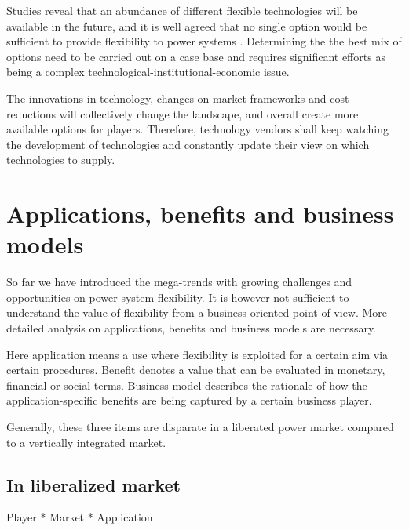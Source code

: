 Studies reveal that an abundance of different flexible technologies will be available in the future, and it is well agreed that no single option would be sufficient to provide flexibility to power systems \cite{Cochran2014,Wang2017,Lund2015,Muller2016}. Determining the the best mix of options need to be carried out on a case base and requires significant efforts as being a complex technological-institutional-economic issue. 

The innovations in technology, changes on market frameworks and cost reductions will collectively change the landscape, and overall create more available options for players. Therefore, technology vendors shall keep watching the development of technologies and constantly update their view on which technologies to supply. 

\section{Applications, benefits and business models}
So far we have introduced the mega-trends with growing challenges and opportunities on power system flexibility. It is however not sufficient to understand the value of flexibility from a business-oriented point of view. More detailed analysis on applications, benefits and business models are necessary.

Here application means a use where flexibility is exploited for a certain aim via certain procedures. Benefit denotes a value that can be evaluated in monetary, financial or social terms. Business model describes the rationale of how the application-specific benefits are being captured by a certain business player.


 Generally, these three items are disparate in a liberated power market compared to a vertically integrated market.

\subsection{In liberalized market}



Player * Market * Application




